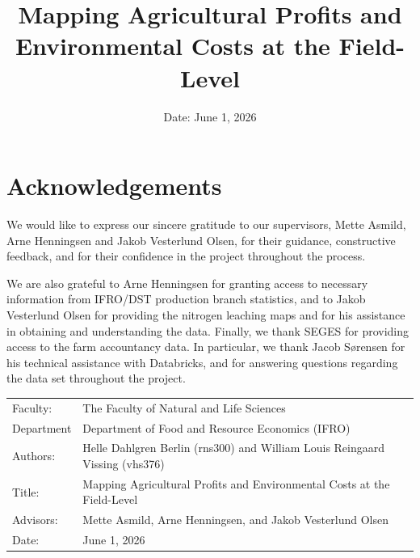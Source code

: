\documentclass[12pt]{article}
\author{}
\title{Mapping Agricultural Profits and Environmental Costs at the Field-Level}
\subtitle{}
\date{Date: {June 1, 2026}}
\begin{document}
\maketitle





\newpage

\section*{Acknowledgements}

We would like to express our sincere gratitude to our supervisors, Mette Asmild, Arne Henningsen and Jakob Vesterlund Olsen, for their guidance, constructive feedback, and for their confidence in the project throughout the process.

We are also grateful to Arne Henningsen for granting access to necessary information from IFRO/DST production branch statistics, and to Jakob Vesterlund Olsen for providing the nitrogen leaching maps and for his assistance in obtaining and understanding the data. 
Finally, we thank SEGES for providing access to the farm accountancy data. 
In particular, we thank Jacob Sørensen for his technical assistance with Databricks, and for answering questions regarding the data set throughout the project.


\begin{table}[h]
\def\arraystretch{1.5}
\begin{tabularx}{\textwidth}{l X}
Faculty: & {The Faculty of Natural and Life Sciences}  \\
Department & {Department of Food and Resource Economics (IFRO)} \\
Authors: & {Helle Dahlgren Berlin (rns300) and William Louis Reingaard Vissing (vhs376)} \\
Title: & {Mapping Agricultural Profits and Environmental Costs at the Field-Level} \\
Advisors: & {Mette Asmild, Arne Henningsen, and Jakob Vesterlund Olsen} \\
Date: & {June 1, 2026}
\end{tabularx}
\end{table}


\newpage
\end{document}
